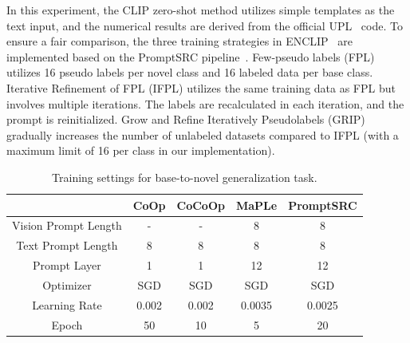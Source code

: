 In this experiment, the CLIP zero-shot method utilizes simple templates as the text input, and the numerical results are derived from the official UPL~\cite{huang2022unsupervised} code.
To ensure a fair comparison, the three training strategies in ENCLIP~\cite{menghini2023enhancing} are implemented based on the PromptSRC pipeline~\cite{khattak2023self}. Few-pseudo labels (FPL) utilizes 16 pseudo labels per novel class and 16 labeled data per base class. Iterative Refinement of FPL (IFPL) utilizes the same training data as FPL but involves multiple iterations. The labels are recalculated in each iteration, and the prompt is reinitialized. Grow and Refine Iteratively Pseudolabels (GRIP) gradually increases the number of unlabeled datasets compared to IFPL (with a maximum limit of 16 per class in our implementation).


\begin{table}[t]
    \centering
    \setlength{\tabcolsep}{15pt}
    \caption{Training settings for base-to-novel generalization task.}
    \resizebox{0.9\linewidth}{!}
    {
        \begin{tabular}{ccccc}
        \hline\noalign{\smallskip}
        ~& CoOp & CoCoOp & MaPLe & PromptSRC \\
        \hline
        Vision Prompt Length & - & - & 8 & 8 \\ 
        Text Prompt Length   & 8 & 8 & 8 & 8 \\ 
        Prompt Layer         & 1 & 1 & 12 & 12 \\ 
        Optimizer            & SGD & SGD & SGD & SGD \\ 
        Learning Rate        & 0.002 & 0.002 & 0.0035 & 0.0025 \\ 
        Epoch                & 50 & 10 & 5 & 20 \\
        \hline
        \end{tabular}
    }
    \label{table:training-setting}
\end{table}





